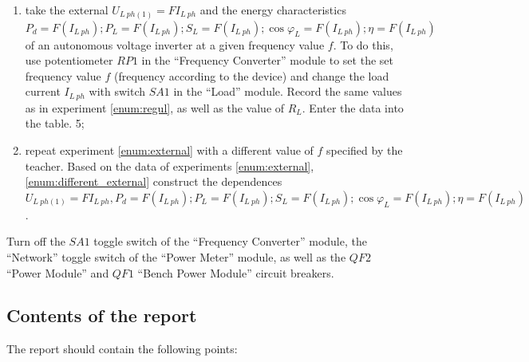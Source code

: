\documentclass[a4paper,14pt]{article}
\begin{document}
\begin{enumerate}
\begin{enumerate}
\item \label{enum:external} take the external $U_{L\:ph(1)} = F{I_{L\:ph}}$ and the energy characteristics $P_d = F(I_{L\:ph}); P_L = F(I_{L\:ph}); S_L = F(I_{L\:ph}); \cos\varphi_L = F(I_{L\:ph}); \eta = F(I_{L\:ph})$  of an autonomous voltage inverter at a given frequency value $f$. 
To do this, use potentiometer $RP1$ in the “Frequency Converter” module to set the set frequency value $f$ (frequency according to the device) and change the load current $I_{L\:ph}$ with switch $SA1$ in the “Load” module. 
Record the same values as in experiment \ref{enum:regul}, as well as the value of $R_L$.
Enter the data into the table. 5;
\item \label{enum:different_external}repeat experiment \ref{enum:external} with a different value of $f$ specified by the teacher. Based on the data of experiments \ref{enum:external}, \ref{enum:different_external} 
construct the dependences $U_{L\:ph(1)} = F{I_{L\:ph}}, P_d = F(I_{L\:ph}); P_L = F(I_{L\:ph}); S_L = F(I_{L\:ph}); \cos\varphi_L = F(I_{L\:ph}); \eta = F(I_{L\:ph})$.

\end{enumerate}
\end{enumerate}

Turn off the $SA1$ toggle switch of the “Frequency Converter” module, the “Network” toggle switch of the “Power Meter” module, as well as the $QF2$ “Power Module” and $QF1$ “Bench Power Module” circuit breakers.

\subsection{Contents of the report}

The report should contain the following points:
\end{document}
